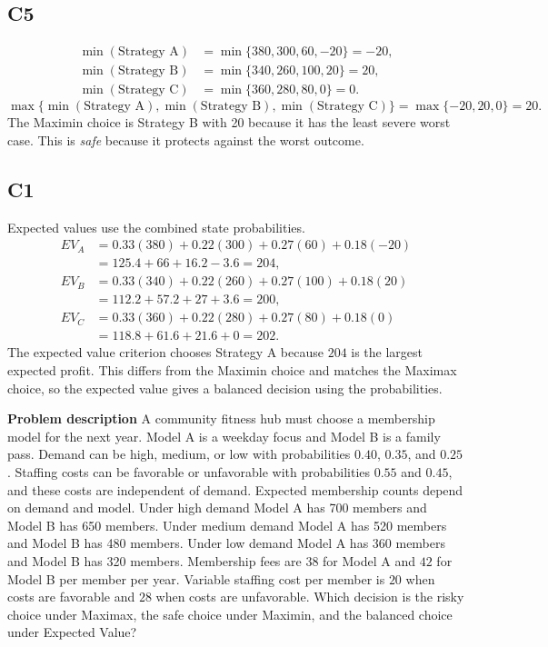 \begin{ExamProblems}
		\subsection*{C5}
		\[
		\begin{aligned}
		\min(\text{Strategy A}) &= \min\{380,300,60,-20\} = -20,\\
		\min(\text{Strategy B}) &= \min\{340,260,100,20\} = 20,\\
		\min(\text{Strategy C}) &= \min\{360,280,80,0\} = 0.
		\end{aligned}
		\]
		\[
		\max\{\min(\text{Strategy A}), \min(\text{Strategy B}), \min(\text{Strategy C})\}
		= \max\{-20, 20, 0\}
		= 20.
		\]
		The Maximin choice is Strategy B with 20 because it has the least severe worst case. This is \emph{safe} because it protects against the worst outcome.

		\subsection*{C1}
		Expected values use the combined state probabilities.
		\[
		\begin{aligned}
		EV_A &= 0.33(380)+0.22(300)+0.27(60)+0.18(-20)\\
		&= 125.4+66+16.2-3.6=204,\\
		EV_B &= 0.33(340)+0.22(260)+0.27(100)+0.18(20)\\
		&= 112.2+57.2+27+3.6=200,\\
		EV_C &= 0.33(360)+0.22(280)+0.27(80)+0.18(0)\\
		&= 118.8+61.6+21.6+0=202.
		\end{aligned}
		\]
		The expected value criterion chooses Strategy A because $204$ is the largest expected profit. This differs from the Maximin choice and matches the Maximax choice, so the expected value gives a balanced decision using the probabilities.

		\item
		\textbf{Problem description}
		A community fitness hub must choose a membership model for the next year. Model A is a weekday focus and Model B is a family pass. Demand can be high, medium, or low with probabilities $0.40$, $0.35$, and $0.25$. Staffing costs can be favorable or unfavorable with probabilities $0.55$ and $0.45$, and these costs are independent of demand. Expected membership counts depend on demand and model. Under high demand Model A has 700 members and Model B has 650 members. Under medium demand Model A has 520 members and Model B has 480 members. Under low demand Model A has 360 members and Model B has 320 members. Membership fees are $38$ for Model A and $42$ for Model B per member per year. Variable staffing cost per member is $20$ when costs are favorable and $28$ when costs are unfavorable. Which decision is the risky choice under Maximax, the safe choice under Maximin, and the balanced choice under Expected Value?


\end{ExamProblems}
